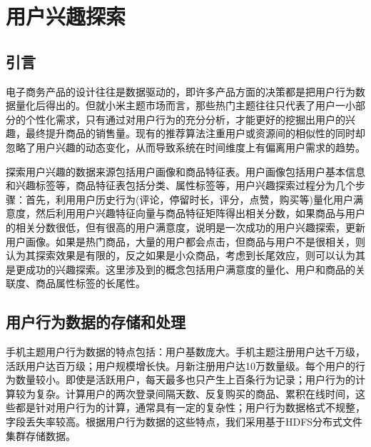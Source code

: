 
\chapter{用户兴趣探索}
\section{引言}
\label{chap:interestExplore}
电子商务产品的设计往往是数据驱动的，即许多产品方面的决策都是把用户行为数据量化后得出的。但就小米主题市场而言，那些热门主题往往只代表了用户一小部分的个性化需求，只有通过对用户行为的充分分析，才能更好的挖掘出用户的兴趣，最终提升商品的销售量。现有的推荐算法注重用户或资源间的相似性的同时却忽略了用户兴趣的动态变化，从而导致系统在时间维度上有偏离用户需求的趋势。

探索用户兴趣的数据来源包括用户画像和商品特征表。用户画像包括用户基本信息和兴趣标签等，商品特征表包括分类、属性标签等，用户兴趣探索过程分为几个步骤：首先，利用用户历史行为(评论，停留时长，评分，点赞，购买等)量化用户满意度，然后利用用户兴趣特征向量与商品特征矩阵得出相关分数，如果商品与用户的相关分数很低，但有很高的用户满意度，说明是一次成功的用户兴趣探索，更新用户画像。如果是热门商品，大量的用户都会点击，但商品与用户不是很相关，则认为其探索效果是有限的，反之如果是小众商品，考虑到长尾效应，则可以认为其是更成功的兴趣探索。这里涉及到的概念包括用户满意度的量化、用户和商品的关联度、商品属性标签的长尾性。

\section{用户行为数据的存储和处理}
手机主题用户行为数据的特点包括：用户基数庞大。手机主题注册用户达千万级，活跃用户达百万级；用户规模增长快。月新注册用户达10万数量级。每个用户的行为数量较小。即使是活跃用户，每天最多也只产生上百条行为记录；用户行为的计算较为复杂。计算用户的两次登录间隔天数、反复购买的商品、累积在线时间，这些都是针对用户行为的计算，通常具有一定的复杂性；用户行为数据格式不规整，字段丢失率较高。根据用户行为数据的这些特点，我们采用基于HDFS分布式文件集群存储数据。

